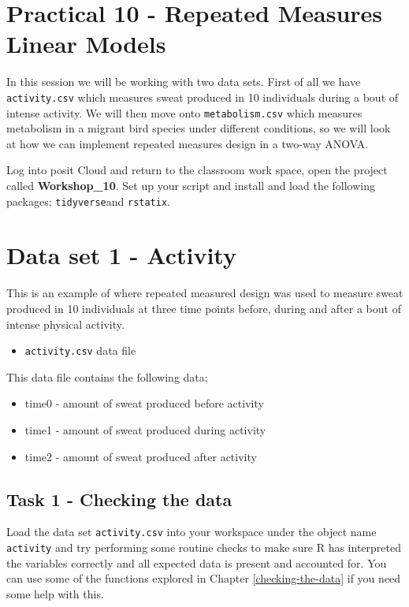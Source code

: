 \documentclass[
]{book}
\providecommand{\tightlist}{%
  \setlength{\itemsep}{0pt}\setlength{\parskip}{0pt}}
\begin{document}
\section{Practical 10 - Repeated Measures Linear Models}\label{practical-10---repeated-measures-linear-models}

In this session we will be working with two data sets. First of all we have \texttt{activity.csv} which measures sweat produced in 10 individuals during a bout of intense activity. We will then move onto \texttt{metabolism.csv} which measures metabolism in a migrant bird species under different conditions, so we will look at how we can implement repeated measures design in a two-way ANOVA.

Log into posit Cloud and return to the classroom work space, open the project called \textbf{Workshop\_10}. Set up your script and install and load the following packages; \texttt{tidyverse}and \texttt{rstatix}.

\section{Data set 1 - Activity}\label{data-set-1---activity}

This is an example of where repeated measured design was used to measure sweat produced in 10 individuals at three time points before, during and after a bout of intense physical activity.

\begin{itemize}
\tightlist
\item
  \texttt{activity.csv} data file
\end{itemize}

This data file contains the following data;

\begin{itemize}
\tightlist
\item
  time0 - amount of sweat produced before activity
\item
  time1 - amount of sweat produced during activity
\item
  time2 - amount of sweat produced after activity
\end{itemize}

\subsection{Task 1 - Checking the data}\label{task-1---checking-the-data-3}

Load the data set \texttt{activity.csv} into your workspace under the object name \texttt{activity} and try performing some routine checks to make sure R has interpreted the variables correctly and all expected data is present and accounted for. You can use some of the functions explored in Chapter \ref{checking-the-data} if you need some help with this.
\end{document}
